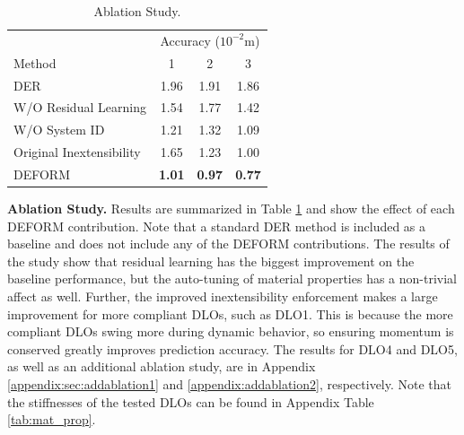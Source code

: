 \begin{table}
\centering
\vspace*{-20pt}
\caption{Ablation Study.}
\begin{tabular}{l|ccc}
        \toprule
        & \multicolumn{3}{c}{Accuracy ($10^{-2}$m)} \\         
        Method & 1 & 2 & 3  \\
        \midrule
        DER & 1.96 & 1.91 & 1.86  \\ 
        W/O Residual Learning & 1.54 & 1.77  & 1.42  \\
        W/O System ID & 1.21 &1.32& 1.09 \\ 
        Original Inextensibility & 1.65  & 1.23  & 1.00 \\
        DEFORM & \textbf{1.01} & \textbf{0.97} & \textbf{0.77}  \\
        \bottomrule
        \end{tabular}
        \vspace*{-14pt}
        \label{tab:ablation study}
\end{table}

\textbf{Ablation Study.}
Results are summarized in Table \ref{tab:ablation study} and show the effect of each DEFORM contribution.
Note that a standard DER method is included as a baseline and does not include any of the DEFORM contributions.
The results of the study show that residual learning has the biggest improvement on the baseline performance, but the auto-tuning of material properties has a non-trivial affect as well. 
Further, the improved inextensibility enforcement makes a large improvement for more compliant DLOs, such as DLO1.
This is because the more compliant DLOs swing more during dynamic behavior, so ensuring momentum is conserved greatly improves prediction accuracy. 
The results for DLO4 and DLO5, as well as an additional ablation study, are in Appendix \ref{appendix:sec:addablation1} and \ref{appendix:addablation2}, respectively.
Note that the stiffnesses of the tested DLOs can be found in Appendix Table 
\ref{tab:mat_prop}.

